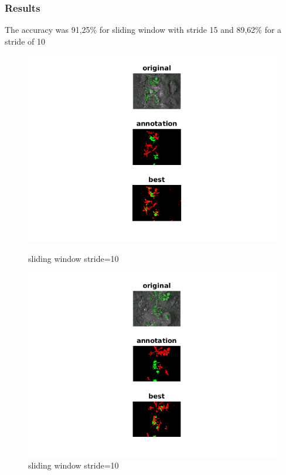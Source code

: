 \documentclass{beamer}
\begin{document}
\begin{frame}

\frametitle{Results}
The accuracy was 91,25\% for sliding window with stride 15 and 89,62\% for a stride of 10
\begin{figure}[!htb]
  \includegraphics[width=\linewidth]{2.png}
  \caption{sliding window stride=10}\label{fig: sliding window 10 1}
\endminipage\hfill
{}
  \includegraphics[width=\linewidth]{6.png}
  \caption{sliding window stride=10}\label{fig:sliding window 10 2}
\endminipage\hfill
\end{figure}
\end{frame}

\end{document}
